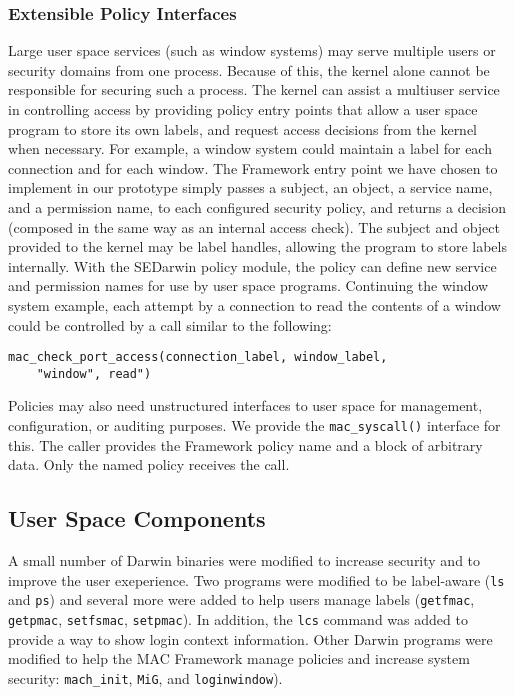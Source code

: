 \subsubsection{Extensible Policy Interfaces}
Large user space services (such as window systems) may serve multiple
users or security domains from one process. Because of this, the
kernel alone cannot be responsible for securing such a process. The
kernel can assist a multiuser service in controlling access by
providing policy entry points that allow a user space program to store
its own labels, and request access decisions from the kernel when
necessary. For example, a window system could maintain a label for
each connection and for each window. The Framework entry point we have
chosen to implement in our prototype simply passes a subject, an
object, a service name, and a permission name, to each configured
security policy, and returns a decision (composed in the same way
as an internal access check). The subject and object provided to
the kernel may be label handles, allowing the program to store
labels internally. With the SEDarwin policy module, the policy can
define new service and permission names for use by user space programs.
Continuing the window system example, each attempt by a connection
to read the contents of a window could be controlled by a call
similar to the following:

\begin{verbatim}
mac_check_port_access(connection_label, window_label,
    "window", read")
\end{verbatim}

Policies may also need unstructured interfaces to user space for
management, configuration, or auditing purposes. We provide the
{\tt mac\_syscall()} interface for this.  The caller provides the
Framework policy name and a block of arbitrary data. Only the named
policy receives the call.

\subsection{User Space Components}

A small number of Darwin binaries were modified to increase security
and to improve the user exeperience.  Two programs were modified
to be label-aware ({\tt ls} and {\tt ps}) and several more were
added to help users manage labels ({\tt getfmac}, {\tt getpmac},
{\tt setfsmac}, {\tt setpmac}).  In addition, the {\tt lcs} command
was added to provide a way to show login context information.  Other
Darwin programs were modified to help the MAC Framework manage
policies and increase system security: {\tt mach\_init}, {\tt MiG},
and {\tt loginwindow}).

